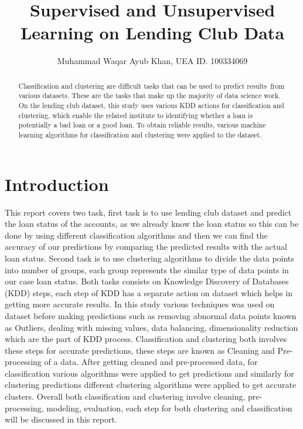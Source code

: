 \documentclass[12pt]{article}
\title{Supervised and Unsupervised Learning on Lending Club Data}
\author{Muhammad Waqar Ayub Khan, UEA ID. 100334069}
\begin{document}
\maketitle

\begin{abstract}
	
\onehalfspacing

Classification and clustering are difficult tasks that can be used to predict results from various datasets. These are the tasks that make up the majority of data science work. On the lending club dataset, this study uses various KDD actions for classification and clustering, which enable the related institute to identifying whether a loan is potentially a bad loan or a good loan. To obtain reliable results, various machine learning algorithms for classification and clustering were applied to the dataset.

\end{abstract}
\doublespacing

\section{Introduction}
This report covers two task, first task is to use lending club dataset and predict the loan status of the accounts, as we already know the loan status so this can be done by using different classification algorithms and then we can find the accuracy of our predictions by comparing the predicted results with the actual loan status. Second task is to use clustering algorithms to divide the data points into number of groups, each group represents the similar type of data points in our case loan status. Both tasks consists on Knowledge Discovery of Databases (KDD) steps, each step of KDD has a separate action on dataset which helps in getting more accurate results. In this study various techniques was used on dataset before making predictions such as removing abnormal data points known as Outliers, dealing with missing values, data balancing, dimensionality reduction which are the part of KDD process. Classification and clustering both involves these steps for accurate predictions, these steps are known as Cleaning and Pre-processing of a data. After getting cleaned and pre-processed data, for classification various algorithms were applied to get predictions and similarly for clustering predictions different clustering algorithms were applied to get accurate clusters. Overall both classification and clustering involve cleaning, pre-processing, modeling, evaluation, each step for both clustering and classification will be discussed in this report.
\end{document}
